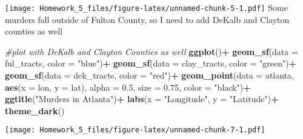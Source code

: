 \documentclass[
]{article}
\newenvironment{Shaded}{\begin{snugshade}}{\end{snugshade}}
\newcommand{\AttributeTok}[1]{\textcolor[rgb]{0.13,0.29,0.53}{#1}}
\newcommand{\CommentTok}[1]{\textcolor[rgb]{0.56,0.35,0.01}{\textit{#1}}}
\newcommand{\FloatTok}[1]{\textcolor[rgb]{0.00,0.00,0.81}{#1}}
\newcommand{\FunctionTok}[1]{\textcolor[rgb]{0.13,0.29,0.53}{\textbf{#1}}}
\newcommand{\NormalTok}[1]{#1}
\newcommand{\SpecialCharTok}[1]{\textcolor[rgb]{0.81,0.36,0.00}{\textbf{#1}}}
\newcommand{\StringTok}[1]{\textcolor[rgb]{0.31,0.60,0.02}{#1}}
\begin{document}
\texttt{[image: Homework\_5\_files/figure-latex/unnamed-chunk-5-1.pdf]}
Some murders fall outside of Fulton County, so I need to add DeKalb and
Clayton counties as well

\begin{Shaded}
\begin{Highlighting}[]
\CommentTok{\#plot with DeKalb and Clayton Counties as well}
\FunctionTok{ggplot}\NormalTok{()}\SpecialCharTok{+}
  \FunctionTok{geom\_sf}\NormalTok{(}\AttributeTok{data =}\NormalTok{ ful\_tracts, }\AttributeTok{color =} \StringTok{"blue"}\NormalTok{)}\SpecialCharTok{+}
  \FunctionTok{geom\_sf}\NormalTok{(}\AttributeTok{data =}\NormalTok{ clay\_tracts, }\AttributeTok{color =} \StringTok{"green"}\NormalTok{)}\SpecialCharTok{+}
  \FunctionTok{geom\_sf}\NormalTok{(}\AttributeTok{data =}\NormalTok{ dek\_tracts, }\AttributeTok{color =} \StringTok{"red"}\NormalTok{)}\SpecialCharTok{+}
  \FunctionTok{geom\_point}\NormalTok{(}\AttributeTok{data =}\NormalTok{ atlanta, }\FunctionTok{aes}\NormalTok{(}\AttributeTok{x =}\NormalTok{ lon, }\AttributeTok{y =}\NormalTok{ lat), }\AttributeTok{alpha =} \FloatTok{0.5}\NormalTok{, }\AttributeTok{size =} \FloatTok{0.75}\NormalTok{, }\AttributeTok{color =} \StringTok{"black"}\NormalTok{)}\SpecialCharTok{+}
  \FunctionTok{ggtitle}\NormalTok{(}\StringTok{"Murders in Atlanta"}\NormalTok{)}\SpecialCharTok{+}
  \FunctionTok{labs}\NormalTok{(}\AttributeTok{x =} \StringTok{"Longitude"}\NormalTok{, }\AttributeTok{y =} \StringTok{"Latitude"}\NormalTok{)}\SpecialCharTok{+}
  \FunctionTok{theme\_dark}\NormalTok{()}
\end{Highlighting}
\end{Shaded}

\texttt{[image: Homework\_5\_files/figure-latex/unnamed-chunk-7-1.pdf]}
\end{document}
